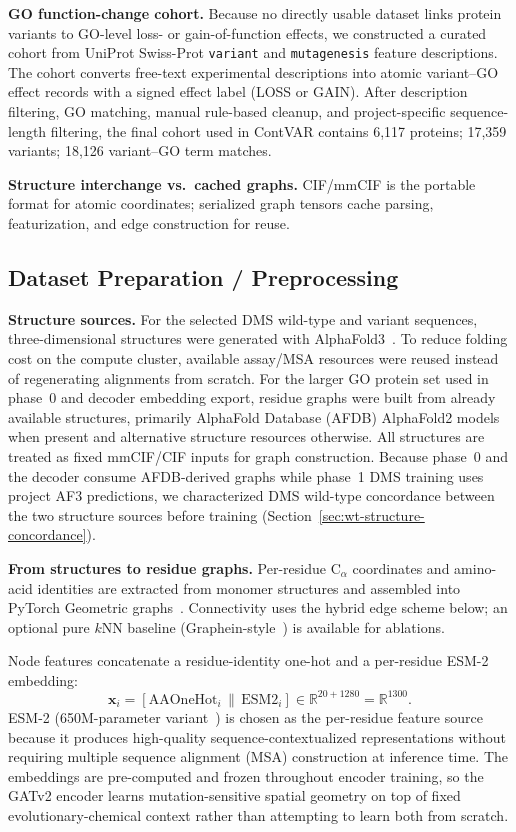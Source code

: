 \documentclass[11pt,a4paper]{article}
\begin{document}
\textbf{GO function-change cohort.} Because no directly usable dataset links protein variants to GO-level loss- or gain-of-function effects, we constructed a curated cohort from UniProt Swiss-Prot \texttt{variant} and \texttt{mutagenesis} feature descriptions. The cohort converts free-text experimental descriptions into atomic variant--GO effect records with a signed effect label (LOSS or GAIN). After description filtering, GO matching, manual rule-based cleanup, and project-specific sequence-length filtering, the final cohort used in ContVAR contains 6,117 proteins; 17,359 variants; 18,126 variant--GO term matches.

\textbf{Structure interchange vs.\ cached graphs.} CIF/mmCIF is the portable format for atomic coordinates; serialized graph tensors cache parsing, featurization, and edge construction for reuse.

\subsection{Dataset Preparation / Preprocessing}
\textbf{Structure sources.} For the selected DMS wild-type and variant sequences, three-dimensional structures were generated with AlphaFold3~\cite{abramson2024alphafold3}. To reduce folding cost on the compute cluster, available assay/MSA resources were reused instead of regenerating alignments from scratch. For the larger GO protein set used in phase~0 and decoder embedding export, residue graphs were built from already available structures, primarily AlphaFold Database (AFDB) AlphaFold2 models~\cite{varadi2022afdb,jumper2021highly} when present and alternative structure resources otherwise. All structures are treated as fixed mmCIF/CIF inputs for graph construction. Because phase~0 and the decoder consume AFDB-derived graphs while phase~1 DMS training uses project AF3 predictions, we characterized DMS wild-type concordance between the two structure sources before training (Section~\ref{sec:wt-structure-concordance}).

\textbf{From structures to residue graphs.} Per-residue $\mathrm{C}_\alpha$ coordinates and amino-acid identities are extracted from monomer structures and assembled into PyTorch Geometric graphs~\cite{fey2019pyg}. Connectivity uses the hybrid edge scheme below; an optional pure $k$NN baseline (Graphein-style~\cite{ramirez2022graphein}) is available for ablations.

Node features concatenate a residue-identity one-hot and a per-residue ESM-2 embedding:
\[
\mathbf{x}_i = [\text{AAOneHot}_i \, \| \, \text{ESM2}_i] \in \mathbb{R}^{20+1280} = \mathbb{R}^{1300}.
\]
ESM-2 (650M-parameter variant~\cite{lin2023evolutionary}) is chosen as the per-residue feature source because it produces high-quality sequence-contextualized representations without requiring multiple sequence alignment (MSA) construction at inference time. The embeddings are pre-computed and frozen throughout encoder training, so the GATv2 encoder learns mutation-sensitive spatial geometry on top of fixed evolutionary-chemical context rather than attempting to learn both from scratch.
\end{document}
